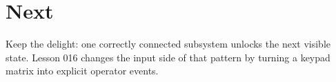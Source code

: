 \documentclass[11pt]{article}
\begin{document}
\section{Next}

Keep the delight: one correctly connected subsystem unlocks the next visible
state. Lesson 016 changes the input side of that pattern by turning a keypad
matrix into explicit operator events.
\end{document}
